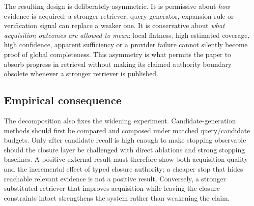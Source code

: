 The resulting design is deliberately asymmetric.  It is permissive about
\emph{how} evidence is acquired: a stronger retriever, query generator,
expansion rule or verification signal can replace a weaker one.  It is
conservative about \emph{what acquisition outcomes are allowed to mean}: local
flatness, high estimated coverage, high confidence, apparent sufficiency or a
provider failure cannot silently become proof of global completeness.  This
asymmetry is what permits the paper to absorb progress in retrieval without
making its claimed authority boundary obsolete whenever a stronger retriever is
published.

\subsection{Empirical consequence}

The decomposition also fixes the widening experiment.  Candidate-generation
methods should first be compared and composed under matched query/candidate
budgets.  Only after candidate recall is high enough to make stopping observable
should the closure layer be challenged with direct ablations and strong stopping
baselines.  A positive external result must therefore show both acquisition
quality and the incremental effect of typed closure authority; a cheaper stop
that hides reachable relevant evidence is not a positive result.  Conversely,
a stronger substituted retriever that improves acquisition while leaving the closure
constraints intact strengthens the system rather than weakening the claim.
